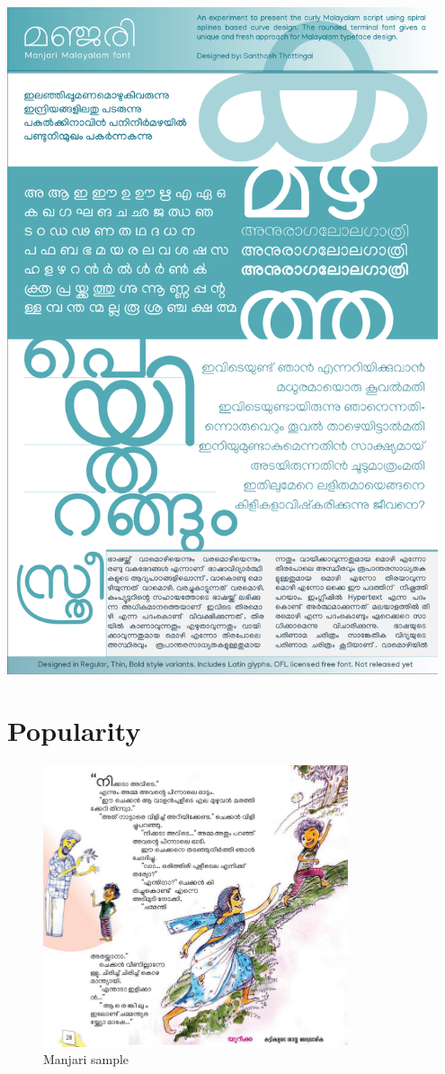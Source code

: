 \documentclass[11pt,twoside,a4paper]{article}
\begin{document}
\includegraphics[width=0.95\textwidth]{images/Manjari-Specimen.pdf}

\clearpage

\section{Popularity}


\begin{figure}[h!]
	\includegraphics[width=0.8\textwidth]{images/manjari-sample-1.png}
	\caption{Manjari sample}
	\label{manjari-sample-1}
\end{figure}
\end{document}
